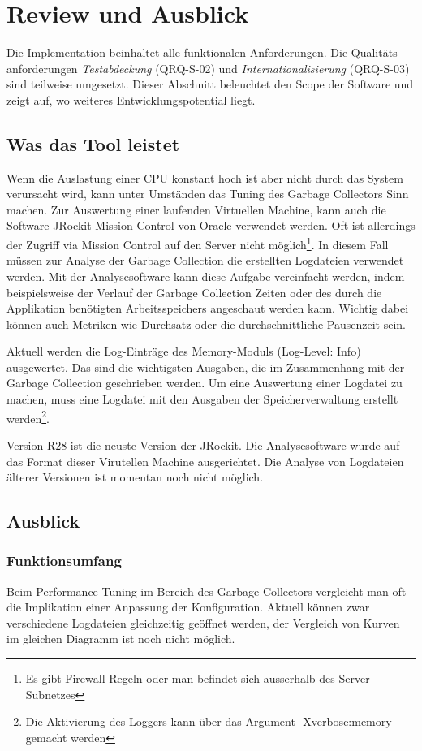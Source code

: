 \chapter{Review und Ausblick}\label{review}
Die Implementation beinhaltet alle funktionalen Anforderungen. Die Qualitäts-anforderungen \textit{Testabdeckung} (QRQ-S-02) und \textit{Internationalisierung} (QRQ-S-03) sind teilweise umgesetzt. Dieser Abschnitt beleuchtet den Scope der Software und zeigt auf, wo weiteres Entwicklungspotential liegt.

\section{Was das Tool leistet}
Wenn die Auslastung einer CPU konstant hoch ist aber nicht durch das System verursacht wird, kann unter Umständen das Tuning des Garbage Collectors Sinn machen. 
Zur Auswertung einer laufenden Virtuellen Machine, kann auch die Software JRockit Mission Control von Oracle verwendet werden. Oft ist allerdings der Zugriff via Mission Control auf den Server nicht möglich\footnote{Es gibt Firewall-Regeln oder man befindet sich ausserhalb des Server-Subnetzes}. In diesem Fall müssen zur Analyse der Garbage Collection die erstellten Logdateien verwendet werden. Mit der Analysesoftware kann diese Aufgabe vereinfacht werden, indem beispielsweise der Verlauf der Garbage Collection Zeiten oder des durch die Applikation benötigten Arbeitsspeichers angeschaut werden kann. Wichtig dabei können auch Metriken wie Durchsatz oder die durchschnittliche Pausenzeit sein.

Aktuell werden die Log-Einträge des Memory-Moduls  (Log-Level: Info) ausgewertet. Das sind die wichtigsten Ausgaben, die im Zusammenhang mit der Garbage Collection geschrieben werden. Um eine Auswertung einer Logdatei zu machen, muss eine Logdatei mit den Ausgaben der Speicherverwaltung erstellt werden\footnote{Die Aktivierung des Loggers kann über das Argument -Xverbose:memory gemacht werden}.

Version R28 ist die neuste Version der JRockit. Die Analysesoftware wurde auf das Format dieser Virutellen Machine ausgerichtet. Die Analyse von Logdateien älterer Versionen ist momentan noch nicht möglich.

\section{Ausblick}
\subsection{Funktionsumfang}
Beim Performance Tuning im Bereich des Garbage Collectors vergleicht man oft die Implikation einer Anpassung der Konfiguration. Aktuell können zwar verschiedene Logdateien gleichzeitig geöffnet werden, der Vergleich von Kurven im gleichen Diagramm ist noch nicht möglich.

